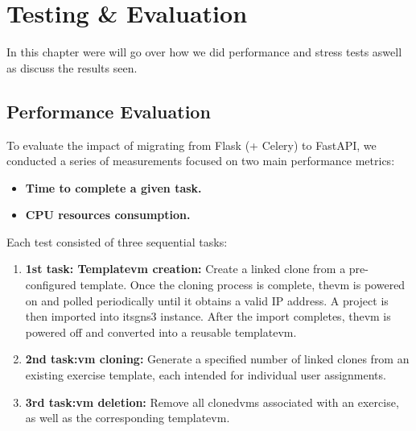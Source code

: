 
\chapter{Testing \& Evaluation}


\label{Chapter6TestingEvaluation}

In this chapter were will go over how we did performance and stress tests aswell as discuss the results seen.

\section{Performance Evaluation}

    To evaluate the impact of migrating from Flask (+ Celery) to FastAPI, we conducted a series of measurements 
    focused on two main performance metrics:

    \begin{itemize}
        \item \textbf{Time to complete a given task.}
        \item \textbf{CPU resources consumption.}
    \end{itemize}

    Each test consisted of three sequential tasks:

    \begin{enumerate}
        \item \textbf{1st task: Template\ac{vm} creation:} Create a linked clone from a pre-configured template. Once 
        the cloning process is complete, the\ac{vm} is powered on and polled periodically until it obtains a valid IP 
        address. A project is then imported into its\ac{gns3} instance. After the import completes, the\ac{vm} is 
        powered off and converted into a reusable template\ac{vm}.

        \item \textbf{2nd task:\ac{vm} cloning:} Generate a specified number of linked clones from an existing exercise 
        template, each intended for individual user assignments.

        \item \textbf{3rd task:\ac{vm} deletion:} Remove all cloned\ac{vm}s associated with an exercise, as well as 
        the corresponding template\ac{vm}.

    \end{enumerate}

